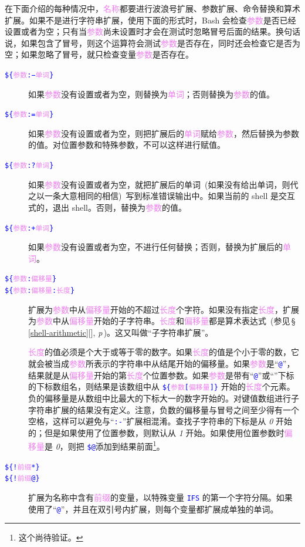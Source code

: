\documentclass[openany,notitlepage]{book}
\newcommand{\code}[1]{\textcolor{blue}{{\tt #1}}}
\newcommand{\hl}[1]{{\sl #1}}
\newcommand{\hs}[1]{{\textcolor{violet}{#1}}}
\newcommand{\fullref}[1]{\,\S\,\ref{#1}[\nameref{#1}], \textit{p\pageref{#1}}\,}
\begin{document}
\begin{CJK}{UTF8}{song}
在下面介绍的每种情况中，\hs{名称}都要进行波浪号扩展、参数扩展、命令替换和算术扩展。如果不是进行字符串扩展，使用下面的形式时，Bash 会检查\hs{参数}是否已经设置或者为空；只有当\hs{参数}尚未设置时才会在测试时忽略冒号后面的结果。换句话说，如果包含了冒号，则这个运算符会测试\hs{参数}是否存在，同时还会检查它是否为空；如果忽略了冒号，就只检查变量\hs{参数}是否存在。

\begin{description}
    \item[\code{\$\{\hs{参数}:−\hs{单词}\}}] 如果\hs{参数}没有设置或者为空，则替换为\hs{单词}；否则替换为\hs{参数}的值。
    \item[\code{\$\{\hs{参数}:=\hs{单词}\}}] 如果\hs{参数}没有设置或者为空，则把扩展后的\hs{单词}赋给\hs{参数}，然后替换为参数的值。对位置参数和特殊参数，不可以这样进行赋值。
    \item[\code{\$\{\hs{参数}:?\hs{单词}\}}] 如果\hs{参数}没有设置或者为空，就把扩展后的单词~(如果没有给出单词，则代之以一条大意相同的相信)~写到标准错误输出中。如果当前的 shell 是交互式的，退出 shell。否则，替换为\hs{参数}的值。
    \item[\code{\$\{\hs{参数}:+\hs{单词}\}}] 如果\hs{参数}没有设置或者为空，不进行任何替换；否则，替换为扩展后的\hs{单词}。
    \item[\code{\$\{\hs{参数}:\hs{偏移量}\}}]
    \item[\code{\$\{\hs{参数}:\hs{偏移量}:\hs{长度}\}}]
    扩展为\hs{参数}中从\hs{偏移量}开始的不超过\hs{长度}个字符。如果没有指定\hs{长度}，扩展为\hs{参数}中从\hs{偏移量}开始的子字符串。\hs{长度}和\hs{偏移量}都是算术表达式~(参见\fullref{shell-arithmetic})。这又叫做``子字符串扩展''。

    \hs{长度}的值必须是个大于或等于零的数字。如果\hs{长度}的值是个小于零的数，它就会被当成\hs{参数}所表示的字符串中从结尾开始的偏移量。如果\hs{参数}是``\code{@}''，结果就是从\hs{偏移量}开始的第\hs{长度}个位置参数。如果\hs{参数}是带有``\code{@}''或``\code{*}''下标的下标数组名，则结果是该数组中从 \code{\$\{\hs{参数}[\hs{偏移量}]\}} 开始的\hs{长度}个元素。负的偏移量是从数组中比最大的下标大一的数字开始的。对键值数组进行子字符串扩展的结果没有定义。注意，负数的偏移量与冒号之间至少得有一个空格，这样可以避免与``\code{:-}''扩展相混淆。查找子字符串的下标是从 \hl{0} 开始的；但是如果使用了位置参数，则默认从 \hl{1} 开始。如果使用位置参数时\hs{偏移量}是 \hl{0}，则把 \code{\$@}添加到结果前面\footnote{这个尚待验证。}。

    \item[\code{\$\{!\hs{前缀}*\}}]
    \item[\code{\$\{!\hs{前缀}@\}}]
    扩展为名称中含有\hs{前缀}的变量，以特殊变量 \code{IFS} 的第一个字符分隔。如果使用了``\code{@}''，并且在双引号内扩展，则每个变量都扩展成单独的单词。


\end{description}
\end{CJK}
\end{document}
